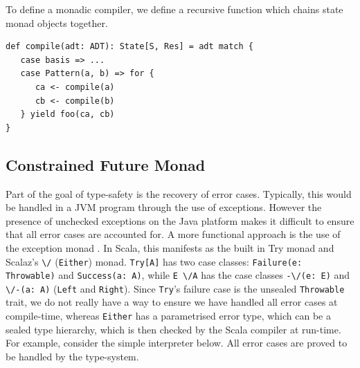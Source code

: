 \documentclass[12pt,a4paper,twoside,openright]{report}
\newcommand\codeName[1]{\texttt{#1}}
\newcommand\either[0]{\textbackslash/}
\newcommand\eitherR[0]{\textbackslash/-}
\newcommand\eitherL[0]{-\textbackslash/}
\renewcommand{\baselinestretch}{1.1}    %
\begin{document}
To define a monadic compiler, we define a recursive function which chains state monad objects together.

\renewcommand{\baselinestretch}{0.8}
\begin{framed}
\begin{verbatim}
def compile(adt: ADT): State[S, Res] = adt match {
   case basis => ...
   case Pattern(a, b) => for {
      ca <- compile(a)
      cb <- compile(b)
   } yield foo(ca, cb) 
}
\end{verbatim}
\end{framed}


	\subsection{Constrained Future Monad}
	Part of the goal of type-safety is the recovery of error cases. Typically, this would be handled in a JVM program through the use of exceptions. However the presence of unchecked exceptions on the Java platform makes it difficult to ensure that all error cases are accounted for. A more functional approach is the use of the exception monad \cite{ExceptionMonad}. In Scala, this manifests as the built in Try monad and Scalaz's \codeName{\either} (\codeName{Either}) monad. \codeName{Try[A]} has two case classes: \codeName{Failure(e: Throwable)} and \codeName{Success(a: A)}, while \codeName{E \either A} has the case classes \codeName{\eitherL(e: E)} and \codeName{\eitherR(a: A)} (\codeName{Left} and \codeName{Right}). Since \codeName{Try}'s failure case is the unsealed \codeName{Throwable} trait, we do not really have a way to ensure we have handled all error cases at compile-time, whereas \codeName{Either} has a parametrised error type, which can be a sealed type hierarchy, which is then checked by the Scala compiler at run-time. For example, consider the simple interpreter below. All error cases are proved to be handled by the type-system.
\end{document}
